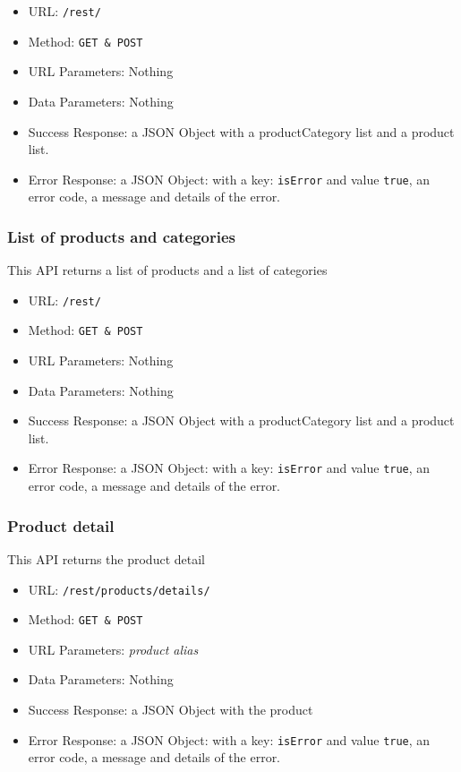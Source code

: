 \begin{itemize}
    \item URL: \texttt{/rest/}
    \item Method: \texttt{GET \& POST}
    \item URL Parameters: Nothing
    \item Data Parameters: Nothing
    \item Success Response: a JSON Object with a productCategory list and a product list.
    \item Error Response: a JSON Object: with a key: \texttt{isError}  and value \texttt{true}, an error code, a message and details of the error.

\end{itemize}

\subsubsection*{List of products and categories}

This API returns a list of products and a list of categories

\begin{itemize}
    \item URL: \texttt{/rest/}
    \item Method: \texttt{GET \& POST}
    \item URL Parameters: Nothing
    \item Data Parameters: Nothing
    \item Success Response: a JSON Object with a productCategory list and a product list.
    \item Error Response: a JSON Object: with a key: \texttt{isError}  and value \texttt{true}, an error code, a message and details of the error.
    
\end{itemize}

\subsubsection*{Product detail}

This API returns the product detail

\begin{itemize}
    \item URL: \texttt{/rest/products/details/}
    \item Method: \texttt{GET \& POST}
    \item URL Parameters: \textit{product alias}
    \item Data Parameters: Nothing
    \item Success Response: a JSON Object with the product
    \item Error Response: a JSON Object: with a key: \texttt{isError}  and value \texttt{true}, an error code, a message and details of the error.
\end{itemize}


